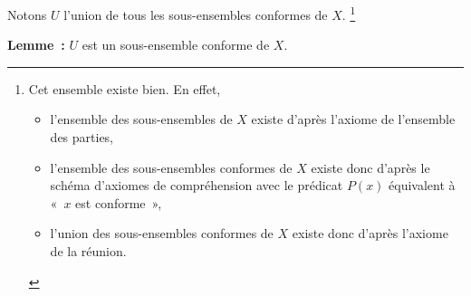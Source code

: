 Notons $U$ l'union de tous les sous-ensembles conformes de $X$.%
\footnote{
    Cet ensemble existe bien. 
    En effet, 
    \begin{itemize}[nosep]
        \item l'ensemble des sous-ensembles de $X$ existe d'après l'axiome de l'ensemble des parties, 
        \item l'ensemble des sous-ensembles conformes de $X$ existe donc d'après le schéma d'axiomes de compréhension avec le prédicat $P(x)$ équivalent à « $x$ est conforme », 
        \item l'union des sous-ensembles conformes de $X$ existe donc d'après l'axiome de la réunion.
    \end{itemize}}

\medskip

\noindent\textbf{Lemme :} $U$ est un sous-ensemble conforme de $X$.

\medskip

